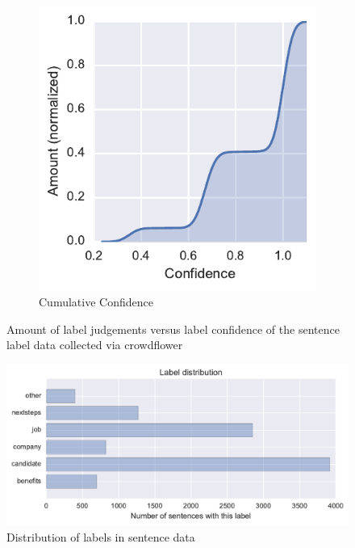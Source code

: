\begin{figure}[h]
\begin{subfigure}[b]{0.43\textwidth}
        \includegraphics[width=\textwidth]{img/sentence-data-judgement-confidence-cumulative.pdf}
        \caption{Cumulative Confidence}
\label{fig:sentence-data-judgement-confidence-cumulative}
    \end{subfigure}
    \caption{Amount of label judgements versus label confidence of the sentence label data collected via crowdflower}
\label{fig:sentence-data-judgements}
\end{figure}



\begin{figure}[h]
    \centering
    \includegraphics[width=\textwidth]{img/sentence-data-label-dist.pdf}
    \caption{Distribution of labels in sentence data}
\label{fig:sentence-data-label-dist}
\end{figure}
